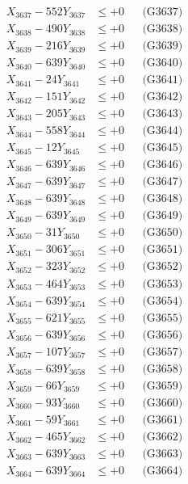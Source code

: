 \documentclass[a4paper,10pt]{article}
\begin{document}
{\begin{align}
X_{3637} - 552Y_{3637} &\leq +0 && \text{(G3637)} \\
X_{3638} - 490Y_{3638} &\leq +0 && \text{(G3638)} \\
X_{3639} - 216Y_{3639} &\leq +0 && \text{(G3639)} \\
X_{3640} - 639Y_{3640} &\leq +0 && \text{(G3640)} \\
\allowbreak
X_{3641} - 24Y_{3641} &\leq +0 && \text{(G3641)} \\
X_{3642} - 151Y_{3642} &\leq +0 && \text{(G3642)} \\
X_{3643} - 205Y_{3643} &\leq +0 && \text{(G3643)} \\
X_{3644} - 558Y_{3644} &\leq +0 && \text{(G3644)} \\
X_{3645} - 12Y_{3645} &\leq +0 && \text{(G3645)} \\
X_{3646} - 639Y_{3646} &\leq +0 && \text{(G3646)} \\
X_{3647} - 639Y_{3647} &\leq +0 && \text{(G3647)} \\
X_{3648} - 639Y_{3648} &\leq +0 && \text{(G3648)} \\
X_{3649} - 639Y_{3649} &\leq +0 && \text{(G3649)} \\
X_{3650} - 31Y_{3650} &\leq +0 && \text{(G3650)} \\
\allowbreak
X_{3651} - 306Y_{3651} &\leq +0 && \text{(G3651)} \\
X_{3652} - 323Y_{3652} &\leq +0 && \text{(G3652)} \\
X_{3653} - 464Y_{3653} &\leq +0 && \text{(G3653)} \\
X_{3654} - 639Y_{3654} &\leq +0 && \text{(G3654)} \\
X_{3655} - 621Y_{3655} &\leq +0 && \text{(G3655)} \\
X_{3656} - 639Y_{3656} &\leq +0 && \text{(G3656)} \\
X_{3657} - 107Y_{3657} &\leq +0 && \text{(G3657)} \\
X_{3658} - 639Y_{3658} &\leq +0 && \text{(G3658)} \\
X_{3659} - 66Y_{3659} &\leq +0 && \text{(G3659)} \\
X_{3660} - 93Y_{3660} &\leq +0 && \text{(G3660)} \\
\allowbreak
X_{3661} - 59Y_{3661} &\leq +0 && \text{(G3661)} \\
X_{3662} - 465Y_{3662} &\leq +0 && \text{(G3662)} \\
X_{3663} - 639Y_{3663} &\leq +0 && \text{(G3663)} \\
X_{3664} - 639Y_{3664} &\leq +0 && \text{(G3664)} \\

\end{align}}
\end{document}
